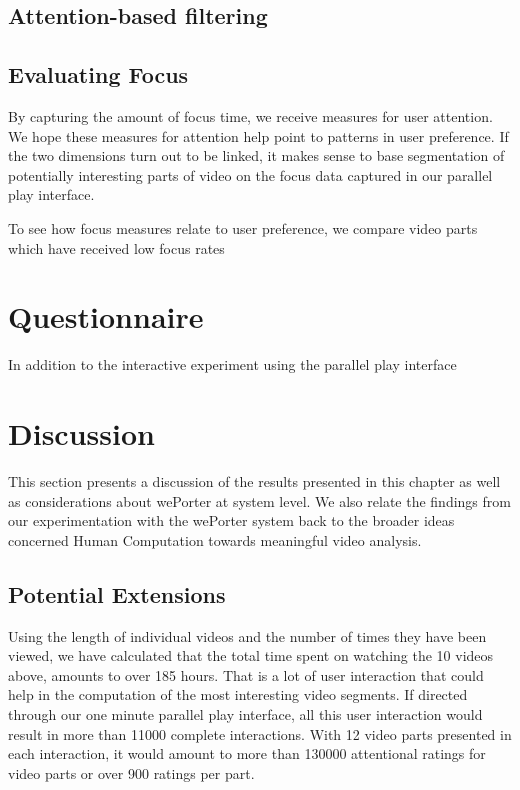 
\subsection{Attention-based filtering} %
\label{sub:attention_based_filtering}



\subsection{Evaluating Focus} %
\label{sub:evaluating_focus}

By capturing the amount of focus time, we receive measures for user attention. We hope these measures for attention help point to patterns in user preference. If the two dimensions turn out to be linked, it makes sense to base segmentation of potentially interesting parts of video on the focus data captured in our parallel play interface.

To see how focus measures relate to user preference, we compare video parts which have received low focus rates


\section{Questionnaire} %
\label{sec:questionnaire}

In addition to the interactive experiment using the parallel play interface


\section{Discussion} %
\label{sec:discussion}

This section presents a discussion of the results presented in this chapter as well as considerations about wePorter at system level. We also relate the findings from our experimentation with the wePorter system back to the broader ideas concerned Human Computation towards meaningful video analysis.

\subsection{Potential Extensions} %
\label{sub:potential_in_real_context}
Using the length of individual videos and the number of times they have been viewed, we have calculated that the total time spent on watching the 10 videos above, amounts to over 185 hours. That is a lot of user interaction that could help in the computation of the most interesting video segments. If directed through our one minute parallel play interface, all this user interaction would result in more than 11000 complete interactions. With 12 video parts presented in each interaction, it would amount to more than 130000 attentional ratings for video parts or over 900 ratings per part. 

